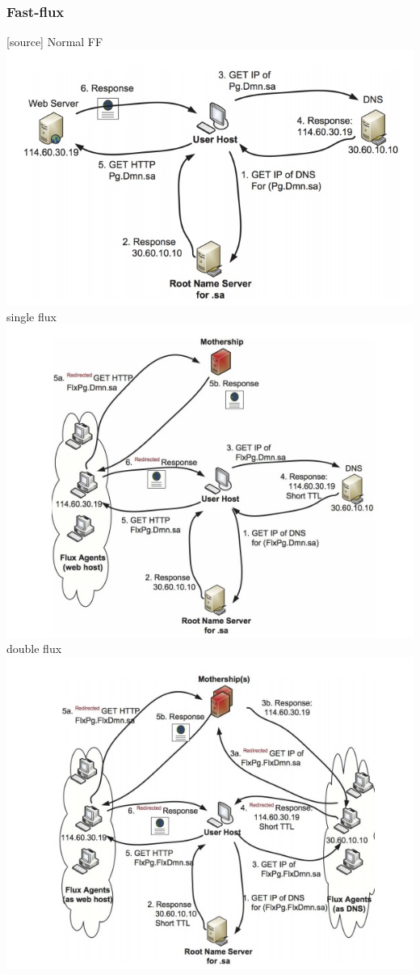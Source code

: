 \subsubsection{Fast-flux}
[source]
Normal FF\\
\includegraphics[scale=.7]{img/normal_FF.jpg}
single flux\\
\includegraphics[scale=.7]{img/single_FF.jpg}
double flux\\
\includegraphics[scale=.7]{img/double_FF.jpg}

